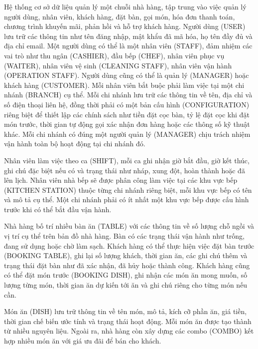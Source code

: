 Hệ thống cơ sở dữ liệu quản lý một chuỗi nhà hàng, tập trung vào việc quản lý người dùng, nhân viên, khách hàng, đặt bàn, gọi món, hóa đơn thanh toán, chương trình khuyến mãi, phản hồi và hỗ trợ khách hàng. Người dùng (USER) lưu trữ các thông tin như tên đăng nhập, mật khẩu đã mã hóa, họ tên đầy đủ và địa chỉ email. Một người dùng có thể là một nhân viên (STAFF), đảm nhiệm các vai trò như thu ngân (CASHIER), đầu bếp (CHEF), nhân viên phục vụ (WAITER), nhân viên vệ sinh (CLEANING STAFF), nhân viên vận hành (OPERATION STAFF). Người dùng cũng có thể là quản lý (MANAGER) hoặc khách hàng (CUSTOMER). Mỗi nhân viên bắt buộc phải làm việc tại một chi nhánh (BRANCH) cụ thể. Mỗi chi nhánh lưu trữ các thông tin về tên, địa chỉ và số điện thoại liên hệ, đồng thời phải có một bản cấu hình (CONFIGURATION) riêng biệt để thiết lập các chính sách như tiền đặt cọc bàn, tỷ lệ đặt cọc khi đặt món trước, thời gian tự động gọi xác nhận đơn hàng hoặc các thông số kỹ thuật khác. Mỗi chi nhánh có đúng một người quản lý (MANAGER) chịu trách nhiệm vận hành toàn bộ hoạt động tại chi nhánh đó.

Nhân viên làm việc theo ca (SHIFT), mỗi ca ghi nhận giờ bắt đầu, giờ kết thúc, ghi chú đặc biệt nếu có và trạng thái như nháp, xung đột, hoàn thành hoặc đã lên lịch. Nhân viên nhà bếp sẽ được phân công làm việc tại các khu vực bếp (KITCHEN STATION) thuộc từng chi nhánh riêng biệt, mỗi khu vực bếp có tên và mô tả cụ thể. Một chi nhánh phải có ít nhất một khu vực bếp được cấu hình trước khi có thể bắt đầu vận hành.

Nhà hàng bố trí nhiều bàn ăn (TABLE) với các thông tin về số lượng chỗ ngồi và vị trí cụ thể trên bản đồ nhà hàng. Bàn có các trạng thái vận hành như trống, đang sử dụng hoặc chờ làm sạch. Khách hàng có thể thực hiện việc đặt bàn trước (BOOKING TABLE), ghi lại số lượng khách, thời gian ăn, các ghi chú thêm và trạng thái đặt bàn như đã xác nhận, đã hủy hoặc thành công. Khách hàng cũng có thể đặt món trước (BOOKING DISH), ghi nhận các món ăn mong muốn, số lượng từng món, thời gian ăn dự kiến tới ăn và ghi chú riêng cho từng món nếu cần.

Món ăn (DISH) lưu trữ thông tin về tên món, mô tả, kích cỡ phần ăn, giá tiền, thời gian chế biến ước tính và trạng thái hoạt động. Mỗi món ăn được tạo thành từ nhiều nguyên liệu. Ngoài ra, nhà hàng còn xây dựng các combo (COMBO) kết hợp nhiều món ăn với giá ưu đãi để bán cho khách.

